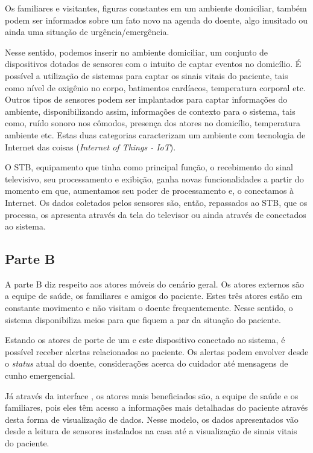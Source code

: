 Os familiares e visitantes, figuras constantes em um ambiente domiciliar, também
podem ser informados sobre um fato novo na agenda do doente, algo inusitado ou 
ainda uma situação de urgência/emergência.

Nesse sentido, podemos inserir no ambiente domiciliar, um conjunto de
dispositivos dotados de sensores com o intuito de captar eventos no domicílio. É
possível a utilização de sistemas para captar os sinais vitais do paciente, tais
como nível de oxigênio no corpo, batimentos cardíacos, temperatura corporal etc.
Outros tipos de sensores podem ser implantados para captar informações do
ambiente, disponibilizando assim, informações de contexto para o sistema,  tais
como, ruído sonoro nos cômodos, presença dos atores no domicílio, temperatura
ambiente etc. Estas duas categorias caracterizam um  ambiente com tecnologia de
Internet das coisas (\textit{Internet of Things  - IoT}).

O STB, equipamento que tinha como principal função, o recebimento do sinal
televisivo, seu processamento e  exibição, ganha novas funcionalidades a partir
do momento em que, aumentamos seu  poder de processamento e, o conectamos à 
Internet. Os dados coletados pelos sensores são, então, repassados ao STB,
que os processa, os apresenta através da tela do televisor ou ainda através de
\smartphones[] conectados ao sistema.

\subsection{Parte B} \label{subsec:parte-b}

A parte B diz respeito aos atores móveis do cenário geral. Os atores externos
são a equipe de saúde, os familiares e amigos do paciente. Estes três atores
estão em constante movimento e não visitam o doente frequentemente. Nesse
sentido, o sistema disponibiliza meios para que fiquem a par da situação do
paciente.

Estando os atores de porte de um \smartphone[] e este dispositivo conectado ao
sistema, é possível receber alertas relacionados ao paciente. Os alertas podem
envolver desde o \textit{status} atual do doente, considerações acerca do
cuidador até mensagens de cunho emergencial.

Já através da interface \web[], os atores mais beneficiados são, a equipe de
saúde e os familiares, pois eles têm acesso a informações mais detalhadas do
paciente através desta forma de visualização de dados. Nesse modelo, os dados
apresentados vão desde a leitura de sensores instalados na casa até a
visualização de sinais vitais do paciente.

